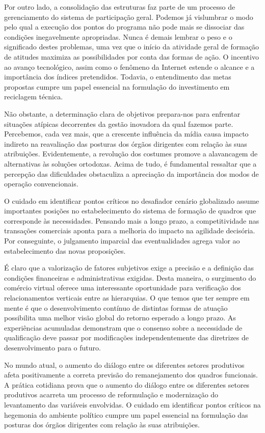 \documentclass[10pt,a4paper,twoside]{article}
\begin{document}
	Por outro lado, a consolidação das estruturas faz parte de um processo de gerenciamento do sistema de participação geral. Podemos já vislumbrar o modo pelo qual a execução dos pontos do programa não pode mais se dissociar das condições inegavelmente apropriadas. Nunca é demais lembrar o peso e o significado destes problemas, uma vez que o início da atividade geral de formação de atitudes maximiza as possibilidades por conta das formas de ação. O incentivo ao avanço tecnológico, assim como o fenômeno da Internet estende o alcance e a importância dos índices pretendidos. Todavia, o entendimento das metas propostas cumpre um papel essencial na formulação do investimento em reciclagem técnica. 
	
	Não obstante, a determinação clara de objetivos prepara-nos para enfrentar situações atípicas decorrentes da gestão inovadora da qual fazemos parte. Percebemos, cada vez mais, que a crescente influência da mídia causa impacto indireto na reavaliação das posturas dos órgãos dirigentes com relação às suas atribuições. Evidentemente, a revolução dos costumes promove a alavancagem de alternativas às soluções ortodoxas. Acima de tudo, é fundamental ressaltar que a percepção das dificuldades obstaculiza a apreciação da importância dos modos de operação convencionais. 
	
	O cuidado em identificar pontos críticos no desafiador cenário globalizado assume importantes posições no estabelecimento do sistema de formação de quadros que corresponde às necessidades. Pensando mais a longo prazo, a competitividade nas transações comerciais aponta para a melhoria do impacto na agilidade decisória. Por conseguinte, o julgamento imparcial das eventualidades agrega valor ao estabelecimento das novas proposições. 
	
	É claro que a valorização de fatores subjetivos exige a precisão e a definição das condições financeiras e administrativas exigidas. Desta maneira, o surgimento do comércio virtual oferece uma interessante oportunidade para verificação dos relacionamentos verticais entre as hierarquias. O que temos que ter sempre em mente é que o desenvolvimento contínuo de distintas formas de atuação possibilita uma melhor visão global do retorno esperado a longo prazo. As experiências acumuladas demonstram que o consenso sobre a necessidade de qualificação deve passar por modificações independentemente das diretrizes de desenvolvimento para o futuro. 
	
	No mundo atual, o aumento do diálogo entre os diferentes setores produtivos afeta positivamente a correta previsão do remanejamento dos quadros funcionais. A prática cotidiana prova que o aumento do diálogo entre os diferentes setores produtivos acarreta um processo de reformulação e modernização do levantamento das variáveis envolvidas. O cuidado em identificar pontos críticos na hegemonia do ambiente político cumpre um papel essencial na formulação das posturas dos órgãos dirigentes com relação às suas atribuições. 
	
\end{document}
